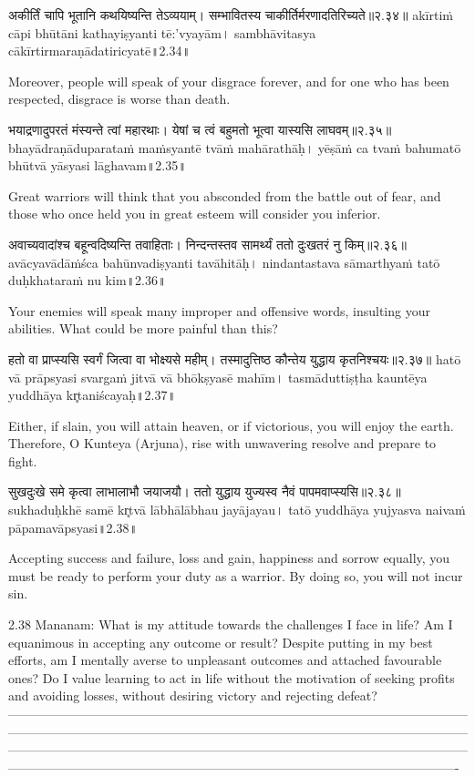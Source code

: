 अकीर्तिं चापि भूतानि कथयिष्यन्ति तेऽव्ययाम्।
सम्भावितस्य चाकीर्तिर्मरणादतिरिच्यते॥२.३४॥
akīrtiṁ cāpi bhūtāni kathayiṣyanti tē:'vyayām।
sambhāvitasya cākīrtirmaraṇādatiricyatē॥2.34॥

Moreover, people will speak of your disgrace forever, and for one who has been respected, disgrace is worse than death.

भयाद्रणादुपरतं मंस्यन्ते त्वां महारथाः।
येषां च त्वं बहुमतो भूत्वा यास्यसि लाघवम्॥२.३५॥
bhayādraṇāduparataṁ maṁsyantē tvāṁ mahārathāḥ।
yēṣāṁ ca tvaṁ bahumatō bhūtvā yāsyasi lāghavam॥2.35॥

Great warriors will think that you absconded from the battle out of fear, and those who once held you in great esteem will consider you inferior.

अवाच्यवादांश्च बहून्वदिष्यन्ति तवाहिताः।
 निन्दन्तस्तव सामर्थ्यं ततो दुःखतरं नु किम्॥२.३६॥
avācyavādāṁśca bahūnvadiṣyanti tavāhitāḥ।
nindantastava sāmarthyaṁ tatō duḥkhataraṁ nu kim॥2.36॥
 
Your enemies will speak many improper and offensive words, insulting your abilities. What could be more painful than this? 

हतो वा प्राप्स्यसि स्वर्गं जित्वा वा भोक्ष्यसे महीम्।
तस्मादुत्तिष्ठ कौन्तेय युद्धाय कृतनिश्चयः॥२.३७॥
hatō vā prāpsyasi svargaṁ jitvā vā bhōkṣyasē mahīm।
tasmāduttiṣṭha kauntēya yuddhāya kr̥taniścayaḥ॥2.37॥

Either, if slain, you will attain heaven, or if victorious, you will enjoy the earth. Therefore, O Kunteya (Arjuna), rise with unwavering resolve and prepare to fight. 


सुखदुःखे समे कृत्वा लाभालाभौ जयाजयौ। 
ततो युद्धाय युज्यस्व नैवं पापमवाप्स्यसि॥२.३८॥
sukhaduḥkhē samē kr̥tvā lābhālābhau jayājayau। 
tatō yuddhāya yujyasva naivaṁ pāpamavāpsyasi॥2.38॥

Accepting success and failure, loss and gain, happiness and sorrow equally, you must be ready to perform your duty as a warrior. By doing so, you will not incur sin. 

2.38 Mananam:
What is my attitude towards the challenges I face in life? Am I equanimous in accepting any outcome or result? Despite putting in my best efforts, am I mentally averse to unpleasant outcomes and attached  favourable ones? Do I value learning to act in life without the motivation of seeking profits and avoiding losses, without desiring victory and rejecting defeat?
—-------------------------------------------------------------------------------------------------------------------------------------------------------------------------------------------------------------------------------------------------------------------------------------------------------------------------------------------------------------------------------------------------------------------------------------------
 
